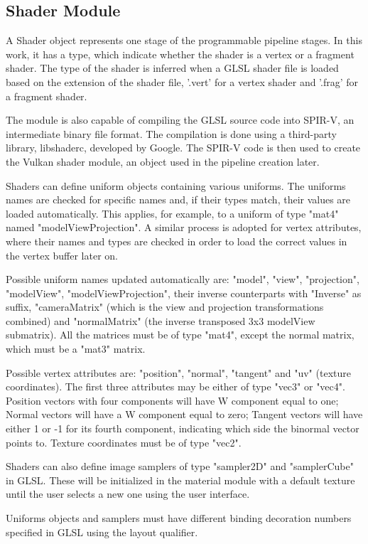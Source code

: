 \subsection{Shader Module}
A Shader object represents one stage of the programmable pipeline stages. In this work, it has a type, which indicate whether the shader is a vertex or a fragment shader. The type of the shader is inferred when a GLSL shader file is loaded based on the extension of the shader file, '.vert' for a vertex shader and '.frag' for a fragment shader.

The module is also capable of compiling the GLSL source code into SPIR-V, an intermediate binary file format. The compilation is done using a third-party library, libshaderc, developed by Google. The SPIR-V code is then used to create the Vulkan shader module, an object used in the pipeline creation later.

Shaders can define uniform objects containing various uniforms. The uniforms names are checked for specific names and, if their types match, their values are loaded automatically. This applies, for example, to a uniform of type "mat4" named "modelViewProjection". A similar process is adopted for vertex attributes, where their names and types are checked in order to load the correct values in the vertex buffer later on.

Possible uniform names updated automatically are: "model", "view", "projection", "modelView", "modelViewProjection", their inverse counterparts with "Inverse" as suffix, "cameraMatrix" (which is the view and projection transformations combined) and "normalMatrix" (the inverse transposed 3x3 modelView submatrix). All the matrices must be of type "mat4", except the normal matrix, which must be a "mat3" matrix.

Possible vertex attributes are: "position", "normal", "tangent" and "uv" (texture coordinates). The first three attributes may be either of type "vec3" or "vec4". Position vectors with four components will have W component equal to one; Normal vectors will have a W component equal to zero; Tangent vectors will have either 1 or -1 for its fourth component, indicating which side the binormal vector points to. Texture coordinates must be of type "vec2".

Shaders can also define image samplers of type "sampler2D" and "samplerCube" in GLSL. These will be initialized in the material module with a default texture until the user selects a new one using the user interface.

Uniforms objects and samplers must have different binding decoration numbers specified in GLSL using the layout qualifier.
